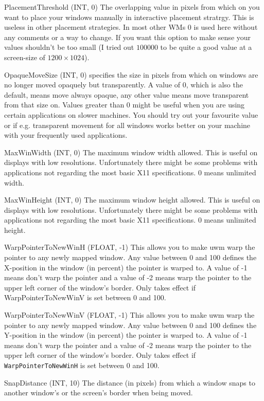 \documentclass[10pt,a4paper]{article}
\newenvironment{ttdesc}[1]{
   \begin{list}{}{
          \renewcommand{\makelabel}[1]{\texttt{##1\hfill}}}}{\end{list}}
\begin{document}
\begin{ttdesc}{description}
\item[PlacementThreshold (INT, 0)] The overlapping value in pixels from which
on you want to place your windows manually in interactive placement stratrgy.
This is useless in other placement strategies. In most other WMs $0$ is used
here without any comments or a way to change. If you want this option to make
sense your values shouldn't be too small (I tried out $100000$ to be quite a
good value at a screen-size of $1200\times1024$).
\item[OpaqueMoveSize (INT, 0)] specifies the size in pixels from which on
windows are no longer moved opaquely but transparently. A value of 0, which is
also the default, means move always opaque, any other value means move
transparent from that size on. Values greater than 0 might be useful when you
are using certain applications on slower machines. You should try out your
favourite value or if e.g. transparent movement for all windows works better
on your machine with your frequently used applications.
\item[MaxWinWidth (INT, 0)] The maximum window width allowed. This is useful
on displays with low resolutions. Unfortunately there might be some problems
with applications not regarding the most basic X11 specifications. 0 means
unlimited width.
\item[MaxWinHeight (INT, 0)] The maximum window height allowed. This is useful
on displays with low resolutions. Unfortunately there might be some problems
with applications not regarding the most basic X11 specifications. 0 means
unlimited height.
\item[WarpPointerToNewWinH (FLOAT, -1)] This allows you to make uwm warp the
pointer to any newly mapped window. Any value between 0 and 100 defines the
X-position in the window (in percent) the pointer is warped to. A value of -1
means don't warp the pointer and a value of -2 means warp the pointer to the
upper left corner of the window's border. Only takes effect if
\textsf{WarpPointerToNewWinV} is set between 0 and 100.
\item[WarpPointerToNewWinV (FLOAT, -1)] This allows you to make uwm warp the
pointer to any newly mapped window. Any value between 0 and 100 defines the
Y-position in the window (in percent) the pointer is warped to. A value of -1
means don't warp the pointer and a value of -2 means warp the pointer to the
upper left corner of the window's border. Only takes effect if
\texttt{WarpPointerToNewWinH} is set between 0 and 100.
\item[SnapDistance (INT, 10) The distance (in pixels)] from which a window snaps to another window's or the screen's border when being moved.

\end{ttdesc}
\end{document}
